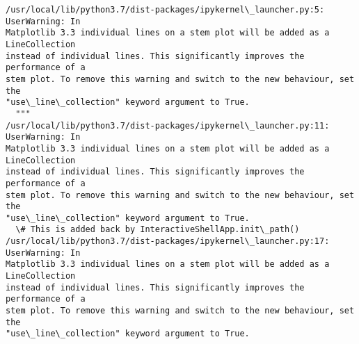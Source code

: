 \documentclass[11pt]{article}
\begin{document}
    \begin{Verbatim}[commandchars=\\\{\}]
/usr/local/lib/python3.7/dist-packages/ipykernel\_launcher.py:5: UserWarning: In
Matplotlib 3.3 individual lines on a stem plot will be added as a LineCollection
instead of individual lines. This significantly improves the performance of a
stem plot. To remove this warning and switch to the new behaviour, set the
"use\_line\_collection" keyword argument to True.
  """
/usr/local/lib/python3.7/dist-packages/ipykernel\_launcher.py:11: UserWarning: In
Matplotlib 3.3 individual lines on a stem plot will be added as a LineCollection
instead of individual lines. This significantly improves the performance of a
stem plot. To remove this warning and switch to the new behaviour, set the
"use\_line\_collection" keyword argument to True.
  \# This is added back by InteractiveShellApp.init\_path()
/usr/local/lib/python3.7/dist-packages/ipykernel\_launcher.py:17: UserWarning: In
Matplotlib 3.3 individual lines on a stem plot will be added as a LineCollection
instead of individual lines. This significantly improves the performance of a
stem plot. To remove this warning and switch to the new behaviour, set the
"use\_line\_collection" keyword argument to True.
    \end{Verbatim}

    \begin{center}
    \end{center}
    { \hspace*{\fill} \\}
    
\end{document}
